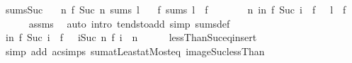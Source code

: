 \begin{isabellebody}
\isanewline
\isanewline
{}\isamarkupfalse%
\ sums{\isacharunderscore}{\kern0pt}Suc{\isacharcolon}{\kern0pt}\isanewline
\ \ \ {\isachardoublequoteopen}{\isacharparenleft}{\kern0pt}{\isasymlambda}n{\isachardot}{\kern0pt}\ f\ {\isacharparenleft}{\kern0pt}Suc\ n{\isacharparenright}{\kern0pt}{\isacharparenright}{\kern0pt}\ sums\ l{\isachardoublequoteclose}\isanewline
\ \ \ {\isachardoublequoteopen}f\ sums\ {\isacharparenleft}{\kern0pt}l\ {\isacharplus}{\kern0pt}\ f\ {}{\isacharparenright}{\kern0pt}{\isachardoublequoteclose}\isanewline
%
\isadelimproof
%
\endisadelimproof
%
\isatagproof
{}\isamarkupfalse%
\ \ {\isacharminus}{\kern0pt}\isanewline
\ \ \isamarkupfalse%
\ {\isachardoublequoteopen}{\isacharparenleft}{\kern0pt}{\isasymlambda}n{\isachardot}{\kern0pt}\ {\isacharparenleft}{\kern0pt}{\isasymSum}i{\isacharless}{\kern0pt}n{\isachardot}{\kern0pt}\ f\ {\isacharparenleft}{\kern0pt}Suc\ i{\isacharparenright}{\kern0pt}{\isacharparenright}{\kern0pt}\ {\isacharplus}{\kern0pt}\ f\ {}{\isacharparenright}{\kern0pt}\ {\isasymlonglonglongrightarrow}\ l\ {\isacharplus}{\kern0pt}\ f\ {}{\isachardoublequoteclose}\isanewline
\ \ \ \ \isamarkupfalse%
\ assms\ \isamarkupfalse%
\ {\isacharparenleft}{\kern0pt}auto\ intro{\isacharbang}{\kern0pt}{\isacharcolon}{\kern0pt}\ tendsto{\isacharunderscore}{\kern0pt}add\ simp{\isacharcolon}{\kern0pt}\ sums{\isacharunderscore}{\kern0pt}def{\isacharparenright}{\kern0pt}\isanewline
\ \ \isamarkupfalse%
\ \isamarkupfalse%
\ {\isachardoublequoteopen}{\isacharparenleft}{\kern0pt}{\isasymSum}i{\isacharless}{\kern0pt}n{\isachardot}{\kern0pt}\ f\ {\isacharparenleft}{\kern0pt}Suc\ i{\isacharparenright}{\kern0pt}{\isacharparenright}{\kern0pt}\ {\isacharplus}{\kern0pt}\ f\ {}\ {\isacharequal}{\kern0pt}\ {\isacharparenleft}{\kern0pt}{\isasymSum}i{\isacharless}{\kern0pt}Suc\ n{\isachardot}{\kern0pt}\ f\ i{\isacharparenright}{\kern0pt}{\isachardoublequoteclose}\ \ n\isanewline
\ \ \ \ \isamarkupfalse%
\ lessThan{\isacharunderscore}{\kern0pt}Suc{\isacharunderscore}{\kern0pt}eq{\isacharunderscore}{\kern0pt}insert{\isacharunderscore}{\kern0pt}{}\isanewline
\ \ \ \ \isamarkupfalse%
\ {\isacharparenleft}{\kern0pt}simp\ add{\isacharcolon}{\kern0pt}\ ac{\isacharunderscore}{\kern0pt}simps\ sum{\isachardot}{\kern0pt}atLeast{}{\isacharunderscore}{\kern0pt}atMost{\isacharunderscore}{\kern0pt}eq\ image{\isacharunderscore}{\kern0pt}Suc{\isacharunderscore}{\kern0pt}lessThan{\isacharparenright}{\kern0pt}\isanewline

\end{isabellebody}
